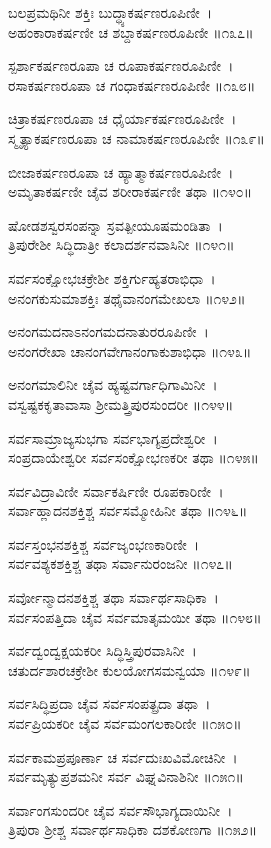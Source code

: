 ಬಲಪ್ರಮಥಿನೀ ಶಕ್ತಿಃ ಬುದ್ಧ್ಯಾಕರ್ಷಣರೂಪಿಣೀ~।\\
ಅಹಂಕಾರಾಕರ್ಷಣೀ ಚ ಶಬ್ದಾಕರ್ಷಣರೂಪಿಣೀ ॥೧೩೭॥

	ಸ್ಪರ್ಶಾಕರ್ಷಣರೂಪಾ ಚ ರೂಪಾಕರ್ಷಣರೂಪಿಣೀ~।\\
	ರಸಾಕರ್ಷಣರೂಪಾ ಚ ಗಂಧಾಕರ್ಷಣರೂಪಿಣೀ ॥೧೩೮॥

ಚಿತ್ರಾಕರ್ಷಣರೂಪಾ ಚ ಧೈರ್ಯಾಕರ್ಷಣರೂಪಿಣೀ~।\\
ಸ್ಮೃತ್ಯಾಕರ್ಷಣರೂಪಾ ಚ ನಾಮಾಕರ್ಷಣರೂಪಿಣೀ ॥೧೩೯॥

	ಬೀಜಾಕರ್ಷಣರೂಪಾ ಚ ಹ್ಯಾತ್ಮಾಕರ್ಷಣರೂಪಿಣೀ~।\\
	ಅಮೃತಾಕರ್ಷಣೀ ಚೈವ ಶರೀರಾಕರ್ಷಣೀ ತಥಾ ॥೧೪೦॥

ಷೋಡಶಸ್ವರಸಂಪನ್ನಾ ಸ್ರವತ್ಪೀಯೂಷಮಂಡಿತಾ~।\\
ತ್ರಿಪುರೇಶೀ ಸಿದ್ಧಿದಾತ್ರೀ ಕಲಾದರ್ಶನವಾಸಿನೀ ॥೧೪೧॥

	ಸರ್ವಸಂಕ್ಷೋಭಚಕ್ರೇಶೀ ಶಕ್ತಿರ್ಗುಹ್ಯತರಾಭಿಧಾ~।\\
	ಅನಂಗಕುಸುಮಾಶಕ್ತಿಃ ತಥೈವಾನಂಗಮೇಖಲಾ ॥೧೪೨॥

ಅನಂಗಮದನಾಽನಂಗಮದನಾತುರರೂಪಿಣೀ~।\\
ಅನಂಗರೇಖಾ ಚಾನಂಗವೇಗಾನಂಗಾಕುಶಾಭಿಧಾ ॥೧೪೩॥

	ಅನಂಗಮಾಲಿನೀ ಚೈವ ಹ್ಯಷ್ಟವರ್ಗಾಧಿಗಾಮಿನೀ~।\\
	ವಸ್ವಷ್ಟಕಕೃತಾವಾಸಾ ಶ್ರೀಮತ್ತ್ರಿಪುರಸುಂದರೀ ॥೧೪೪॥

ಸರ್ವಸಾಮ್ರಾಜ್ಯಸುಭಗಾ ಸರ್ವಭಾಗ್ಯಪ್ರದೇಶ್ವರೀ~।\\
ಸಂಪ್ರದಾಯೇಶ್ವರೀ ಸರ್ವಸಂಕ್ಷೋಭಣಕರೀ ತಥಾ ॥೧೪೫॥

	ಸರ್ವವಿದ್ರಾವಿಣೀ ಸರ್ವಾಕರ್ಷಿಣೀ ರೂಪಕಾರಿಣೀ~।\\
	ಸರ್ವಾಹ್ಲಾದನಶಕ್ತಿಶ್ಚ ಸರ್ವಸಮ್ಮೋಹಿನೀ ತಥಾ ॥೧೪೬॥

ಸರ್ವಸ್ತಂಭನಶಕ್ತಿಶ್ಚ ಸರ್ವಜೃಂಭಣಕಾರಿಣೀ~।\\
ಸರ್ವವಶ್ಯಕಶಕ್ತಿಶ್ಚ ತಥಾ ಸರ್ವಾನುರಂಜನೀ ॥೧೪೭॥

	ಸರ್ವೋನ್ಮಾದನಶಕ್ತಿಶ್ಚ ತಥಾ ಸರ್ವಾರ್ಥಸಾಧಿಕಾ~।\\
	ಸರ್ವಸಂಪತ್ತಿದಾ ಚೈವ ಸರ್ವಮಾತೃಮಯೀ ತಥಾ ॥೧೪೮॥

ಸರ್ವದ್ವಂದ್ವಕ್ಷಯಕರೀ ಸಿದ್ಧಿಸ್ತ್ರಿಪುರವಾಸಿನೀ~।\\
ಚತುರ್ದಶಾರಚಕ್ರೇಶೀ ಕುಲಯೋಗಸಮನ್ವಯಾ ॥೧೪೯॥

	ಸರ್ವಸಿದ್ಧಿಪ್ರದಾ ಚೈವ ಸರ್ವಸಂಪತ್ಪ್ರದಾ ತಥಾ~।\\
	ಸರ್ವಪ್ರಿಯಕರೀ ಚೈವ ಸರ್ವಮಂಗಲಕಾರಿಣೀ ॥೧೫೦॥

ಸರ್ವಕಾಮಪ್ರಪೂರ್ಣಾ ಚ ಸರ್ವದುಃಖವಿಮೋಚಿನೀ~।\\
ಸರ್ವಮೃತ್ಯುಪ್ರಶಮನೀ ಸರ್ವ ವಿಘ್ನವಿನಾಶಿನೀ ॥೧೫೧॥

	ಸರ್ವಾಂಗಸುಂದರೀ ಚೈವ ಸರ್ವಸೌಭಾಗ್ಯದಾಯಿನೀ~।\\
	ತ್ರಿಪುರಾ ಶ್ರೀಶ್ಚ ಸರ್ವಾರ್ಥಸಾಧಿಕಾ ದಶಕೋಣಗಾ ॥೧೫೨॥

